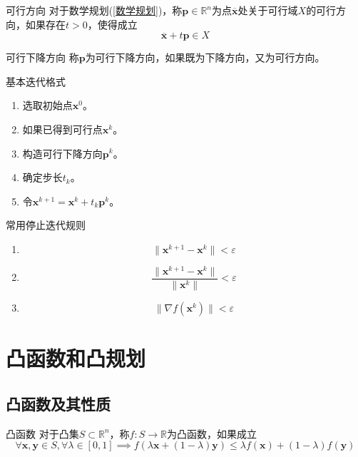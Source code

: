\documentclass[lang = cn, scheme = chinese, thmcnt = section]{elegantbook}
\newcommand{\R}{\mathbb{R}}            %
\newcommand{\sub}{\subset}             %
\newcommand{\bs}{\boldsymbol}          %
\begin{document}
\begin{definition}{可行方向}
	对于数学规划(\ref{数学规划})，称$\bs{p}\in\R^n$为点$\overline{\bs{x}}$处关于可行域$X$的可行方向，如果存在$t>0$，使得成立
	$$
	\overline{\bs{x}}+t\bs{p}\in X
	$$
\end{definition}

\begin{definition}{可行下降方向}
	称$\bs{p}$为可行下降方向，如果既为下降方向，又为可行方向。
\end{definition}

\begin{definition}{基本迭代格式}
	\begin{enumerate}
		\item 选取初始点$\bs{x}^0$。
		\item 如果已得到可行点$\bs{x}^k$。
		\item 构造可行下降方向$\bs{p}^k$。
		\item 确定步长$t_k$。
		\item 令$\bs{x}^{k+1}=\bs{x}^k+t_k\bs{p}^k$。
	\end{enumerate}
\end{definition}

\begin{definition}{常用停止迭代规则}
	\begin{enumerate}
		\item 
		$$
		\| \bs{x}^{k+1}-\bs{x}^k \|<\varepsilon
		$$
		\item 
		$$
		\frac{\| \bs{x}^{k+1}-\bs{x}^k \|}{\| \bs{x}^k \|}<\varepsilon
		$$
		\item 
		$$
		\|\nabla f(\bs{x}^k) \|<\varepsilon
		$$
	\end{enumerate}
\end{definition}

\section{凸函数和凸规划}

\subsection{凸函数及其性质}

\begin{definition}{凸函数}
	对于凸集$S\sub\R^n$，称$f:S\to\R$为凸函数，如果成立
	$$
	\forall \bs{x},\bs{y}\in S,\forall \lambda\in[0,1]\implies
	f(\lambda\bs{x}+(1-\lambda)\bs{y})
	\le\lambda f(\bs{x})+(1-\lambda)f(\bs{y})
	$$
\end{definition}
\end{document}
